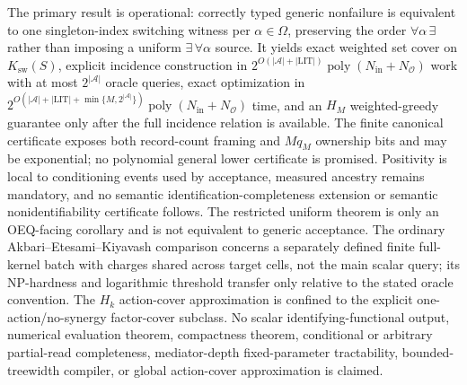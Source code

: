 \documentclass{article}
\begin{document}
The primary result is operational: correctly typed generic nonfailure is equivalent to one singleton-index switching witness per \(\alpha\in\Omega\), preserving the order \(\forall\alpha\,\exists\) rather than imposing a uniform \(\exists\,\forall\alpha\) source.  It yields exact weighted set cover on \(K_{\mathrm{sw}}(S)\), explicit incidence construction in \(2^{O(|\mathcal A|+|\mathrm{LIT}|)}\operatorname{poly}(N_{\mathrm{in}}+N_{\mathcal O})\) work with at most \(2^{|\mathcal A|}\) oracle queries, exact optimization in \(2^{O(|\mathcal A|+|\mathrm{LIT}|+\min\{M,2^{|\mathcal A|}\})}\operatorname{poly}(N_{\mathrm{in}}+N_{\mathcal O})\) time, and an \(H_M\) weighted-greedy guarantee only after the full incidence relation is available.  The finite canonical certificate exposes both record-count framing and \(Mq_M\) ownership bits and may be exponential; no polynomial general lower certificate is promised.  Positivity is local to conditioning events used by acceptance, measured ancestry remains mandatory, and no semantic identification-completeness extension or semantic nonidentifiability certificate follows.  The restricted uniform theorem is only an OEQ-facing corollary and is not equivalent to generic acceptance.  The ordinary Akbari--Etesami--Kiyavash comparison concerns a separately defined finite full-kernel batch with charges shared across target cells, not the main scalar query; its NP-hardness and logarithmic threshold transfer only relative to the stated oracle convention.  The \(H_k\) action-cover approximation is confined to the explicit one-action/no-synergy factor-cover subclass.  No scalar identifying-functional output, numerical evaluation theorem, compactness theorem, conditional or arbitrary partial-read completeness, mediator-depth fixed-parameter tractability, bounded-treewidth compiler, or global action-cover approximation is claimed.
\end{document}
